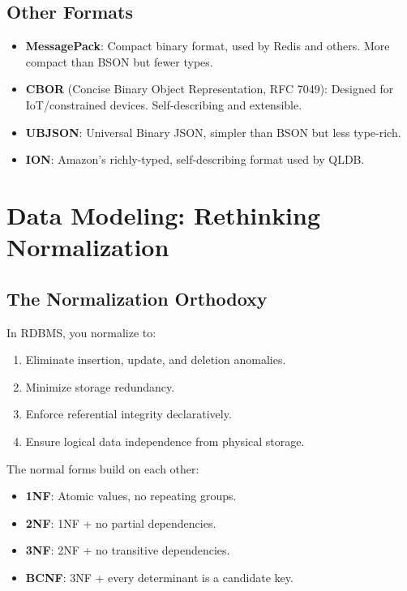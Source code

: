 \documentclass[12pt,a4paper]{article}
\begin{document}
\subsection{Other Formats}

\begin{itemize}[noitemsep]
    \item \textbf{MessagePack}: Compact binary format, used by Redis and others. More compact than BSON but fewer types.
    \item \textbf{CBOR} (Concise Binary Object Representation, RFC 7049): Designed for IoT/constrained devices. Self-describing and extensible.
    \item \textbf{UBJSON}: Universal Binary JSON, simpler than BSON but less type-rich.
    \item \textbf{ION}: Amazon's richly-typed, self-describing format used by QLDB.
\end{itemize}

\section{Data Modeling: Rethinking Normalization}

\subsection{The Normalization Orthodoxy}

In RDBMS, you normalize to:
\begin{enumerate}[noitemsep]
    \item Eliminate insertion, update, and deletion anomalies.
    \item Minimize storage redundancy.
    \item Enforce referential integrity declaratively.
    \item Ensure logical data independence from physical storage.
\end{enumerate}

The normal forms build on each other:
\begin{itemize}[noitemsep]
    \item \textbf{1NF}: Atomic values, no repeating groups.
    \item \textbf{2NF}: 1NF + no partial dependencies.
    \item \textbf{3NF}: 2NF + no transitive dependencies.
    \item \textbf{BCNF}: 3NF + every determinant is a candidate key.
\end{itemize}
\end{document}
